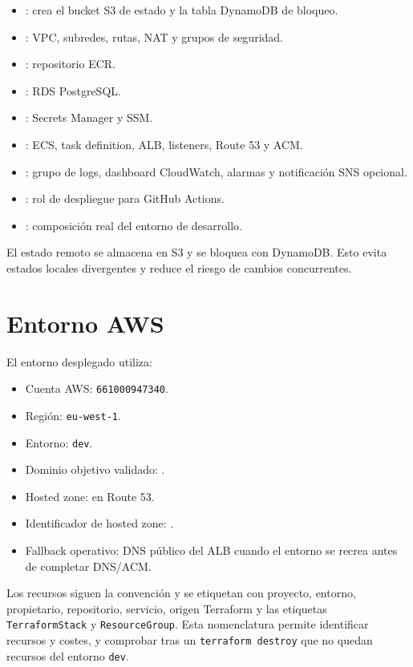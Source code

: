 \begin{itemize}
  \item {}: crea el bucket S3 de estado y la tabla DynamoDB de bloqueo.
  \item {}: VPC, subredes, rutas, NAT y grupos de seguridad.
  \item {}: repositorio ECR.
  \item {}: RDS PostgreSQL.
  \item {}: Secrets Manager y SSM.
  \item {}: ECS, task definition, ALB, listeners, Route 53 y ACM.
  \item {}: grupo de logs, dashboard CloudWatch, alarmas y notificación SNS opcional.
  \item {}: rol de despliegue para GitHub Actions.
  \item {}: composición real del entorno de desarrollo.
\end{itemize}

El estado remoto se almacena en S3 y se bloquea con DynamoDB. Esto evita estados locales divergentes y reduce el riesgo de cambios concurrentes.

\section{Entorno AWS}
\label{sec:entorno-aws}

El entorno desplegado utiliza:

\begin{itemize}
  \item Cuenta AWS: \texttt{661000947340}.
  \item Región: \texttt{eu-west-1}.
  \item Entorno: \texttt{dev}.
  \item Dominio objetivo validado: .
  \item Hosted zone:  en Route 53.
  \item Identificador de hosted zone: .
  \item Fallback operativo: DNS público del ALB cuando el entorno se recrea antes de completar DNS/ACM.
\end{itemize}

Los recursos siguen la convención  y se etiquetan con proyecto, entorno, propietario, repositorio, servicio, origen Terraform y las etiquetas \texttt{TerraformStack} y \texttt{ResourceGroup}. Esta nomenclatura permite identificar recursos y costes, y comprobar tras un \texttt{terraform destroy} que no quedan recursos del entorno \texttt{dev}.

